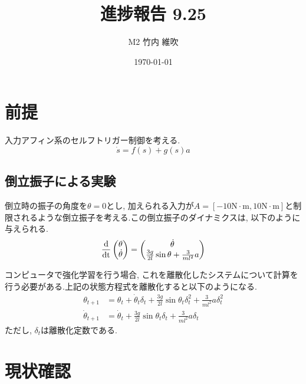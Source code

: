 \documentclass{jsarticle}
\title{\large{\bf{進捗報告 9.25}}}
\author{M2 竹内 維吹}
\date{\today}
\newcommand{\odif}[2]{\frac{\rm{d}#1}{\rm{d}#2}}
\begin{document}
\maketitle


\section{前提}
入力アフィン系のセルフトリガー制御を考える. 
\begin{equation}
	\dot{s} = f(s) + g(s)a \label{continuous}
\end{equation}

\subsection{倒立振子による実験}
倒立時の振子の角度を$\theta=0$とし, 加えられる入力が$A=[-10\textrm{N}\cdot\textrm{m},10\textrm{N}\cdot\textrm{m}]$と制限されるような倒立振子を考える.この倒立振子のダイナミクスは, 以下のように与えられる.
\begin{equation}
	\odif{}{t}\begin{pmatrix}\theta \\ \dot{\theta}\end{pmatrix} = 
		\begin{pmatrix}\dot{\theta} \\ \frac{3g}{2l}\sin{\theta} + \frac{3}{ml^2}a \end{pmatrix} \label{pendulum}
\end{equation}

コンピュータで強化学習を行う場合, これを離散化したシステムについて計算を行う必要がある.上記の状態方程式を離散化すると以下のようになる.
\begin{align}
	\theta_{t+1} &= \theta_t+\dot{\theta}_t\delta_t+\frac{3g}{2l}\sin{\theta_t}\delta_t^2+\frac{3}{ml^2}a\delta_t^2 \tag{3a}\\
	\dot{\theta}_{t+1} &=  \dot{\theta}_t+\frac{3g}{2l}\sin{\theta_t}\delta_t+\frac{3}{ml^2}a\delta_t \tag{3b}
\end{align}\label{pend}
\setcounter{equation}{3}
ただし, $\delta_t$は離散化定数である.\par


\section{現状確認}
\end{document}
